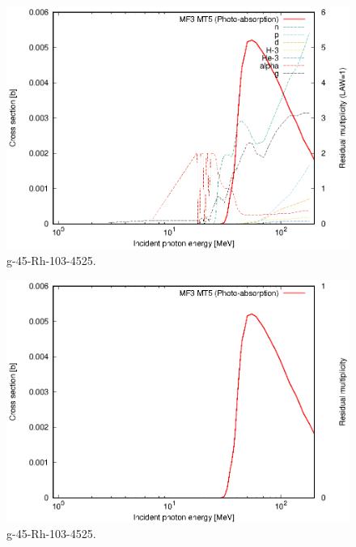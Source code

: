 \begin{figure}
 \includegraphics[width=\linewidth]{eps/g_45-Rh-103_4525.eps}
  \caption{g-45-Rh-103-4525.}
\end{figure}
\begin{figure}
 \includegraphics[width=\linewidth]{eps-law0/g_45-Rh-103_4525.eps}
 \caption{g-45-Rh-103-4525.}
\end{figure}
\newpage \clearpage

